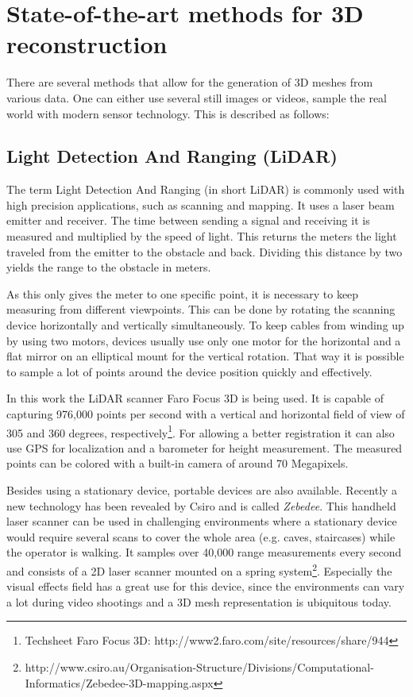 \section{State-of-the-art methods for 3D reconstruction}

There are several methods that allow for the generation of 3D meshes from various data. One can either use several still images or videos, sample the real world with modern sensor technology. This is described as follows:

\subsection{Light Detection And Ranging (LiDAR)}

The term Light Detection And Ranging (in short LiDAR) is commonly used with high precision applications, such as scanning and mapping. It uses a laser beam emitter and receiver. The time between sending a signal and receiving it is measured and multiplied by the speed of light. This returns the meters the light traveled from the emitter to the obstacle and back. Dividing this distance by two yields the range to the obstacle in meters.

As this only gives the meter to one specific point, it is necessary to keep measuring from different viewpoints. This can be done by rotating the scanning device horizontally and vertically simultaneously. To keep cables from winding up by using two motors, devices usually use only one motor for the horizontal and a flat mirror on an elliptical mount for the vertical rotation. That way it is possible to sample a lot of points around the device position quickly and effectively.

In this work the LiDAR scanner Faro Focus 3D is being used. It is capable of capturing 976,000 points per second with a vertical and horizontal field of view of 305 and 360 degrees, respectively\footnote{Techsheet Faro Focus 3D: http://www2.faro.com/site/resources/share/944}. For allowing a better registration it can also use GPS for localization and a barometer for height measurement. The measured points can be colored with a built-in camera of around 70 Megapixels.

Besides using a stationary device, portable devices are also available. Recently a new technology has been revealed by Csiro and is called \textit{Zebedee}. This handheld laser scanner can be used in challenging environments where a stationary device would require several scans to cover the whole area (e.g. caves, staircases) while the operator is walking. It samples over 40,000 range measurements every second and consists of a 2D laser scanner mounted on a spring system\footnote{http://www.csiro.au/Organisation-Structure/Divisions/Computational-Informatics/Zebedee-3D-mapping.aspx}. Especially the visual effects field has a great use for this device, since the environments can vary a lot during video shootings and a 3D mesh representation is ubiquitous today.

